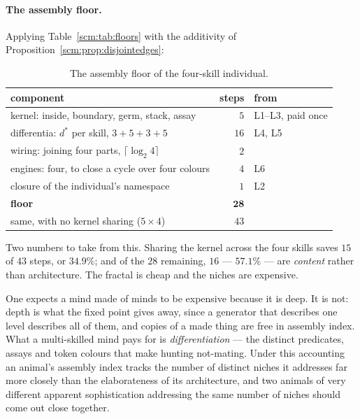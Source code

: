 \paragraph{The assembly floor.}
Applying Table~\ref{scm:tab:floors} with the additivity of
Proposition~\ref{scm:prop:disjointedges}:

\begin{table}[h]
\centering
\begin{tabular}{lrl}
\toprule
component & steps & from \\
\midrule
kernel: inside, boundary, germ, stack, assay & $5$ & L1--L3, paid once \\
differentia: $d^\ast$ per skill, $3+5+3+5$   & $16$ & L4, L5 \\
wiring: joining four parts, $\lceil \log_2 4\rceil$ & $2$ & \\
engines: four, to close a cycle over four colours & $4$ & L6 \\
closure of the individual's namespace        & $1$ & L2 \\
\midrule
\textbf{floor} & $\mathbf{28}$ & \\
\midrule
same, with no kernel sharing ($5 \times 4$)  & $43$ & \\
\bottomrule
\end{tabular}
\caption{The assembly floor of the four-skill individual.}
\label{scm:tab:floor}
\end{table}

Two numbers to take from this. Sharing the kernel across the four skills
saves $15$ of $43$ steps, or $34.9\%$; and of the $28$ remaining, $16$ ---
$57.1\%$ --- are \emph{content} rather than architecture. The fractal is
cheap and the niches are expensive.

\begin{remark}
\label{scm:rmk:economy}
One expects a mind made of minds to be expensive because it is deep. It is
not: depth is what the fixed point gives away, since a generator that
describes one level describes all of them, and copies of a made thing are
free in assembly index. What a multi-skilled mind pays for is
\emph{differentiation} --- the distinct predicates, assays and token
colours that make hunting not-mating. Under this accounting an animal's
assembly index tracks the number of distinct niches it addresses far more
closely than the elaborateness of its architecture, and two animals of
very different apparent sophistication addressing the same number of
niches should come out close together.
\end{remark}

